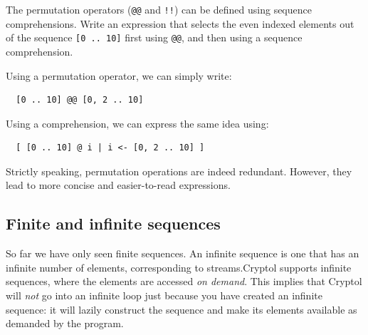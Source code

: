 \begin{Exercise}\label{ex:seq:8}
  The permutation operators ({\tt @@} and {\tt !!}) can be defined
  using sequence comprehensions.  Write an expression that selects the
  even indexed elements out of the sequence \texttt{[0 ..\ 10]} first
  using {\tt @@}, and then using a sequence comprehension.
\end{Exercise}
\begin{Answer}
Using a permutation operator, we can simply write:
\begin{Verbatim}
  [0 .. 10] @@ [0, 2 .. 10]
\end{Verbatim}
Using a comprehension, we can express the same idea using:
\begin{Verbatim}
  [ [0 .. 10] @ i | i <- [0, 2 .. 10] ]
\end{Verbatim}
Strictly speaking, permutation operations are indeed redundant.
However, they lead to more concise and easier-to-read expressions.
\end{Answer}

\subsection{Finite and infinite sequences}\indFiniteSeq\indInfSeq
\label{sec:finite-infin-sequ}

So far we have only seen finite sequences. An infinite sequence is one
that has an infinite number of elements, corresponding to
streams.\indStream Cryptol supports infinite sequences, where the
elements are accessed \emph{on demand}. This implies that Cryptol will
\emph{not} go into an infinite loop just because you have created an
infinite sequence: it will lazily construct the sequence and make its
elements available as demanded by the program.

